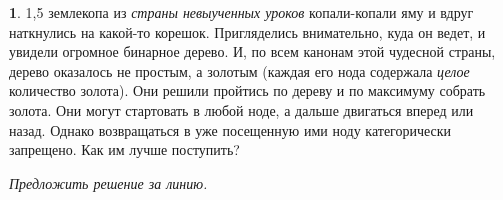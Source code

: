 \documentclass[14pt, a4paper]{extarticle}
\theoremstyle{definition}
\newtheorem{problem}{}
\theoremstyle{definition}
\theoremstyle{remark}
\numberwithin{equation}{section}
\begin{document}
\begin{problem}
    1,5 землекопа из \textit{страны невыученных уроков} копали-копали яму
    и вдруг наткнулись на какой-то корешок. Пригляделись внимательно,
    куда он ведет, и увидели огромное бинарное дерево. И, по всем канонам
    этой чудесной страны, дерево оказалось не простым, а золотым 
    (каждая его нода
    содержала \textit{целое} количество золота). Они решили пройтись 
    по дереву и по максимуму собрать золота. Они могут
    стартовать в любой ноде, а дальше двигаться вперед или назад. 
    Однако возвращаться в уже посещенную ими ноду категорически 
    запрещено. Как им лучше поступить?

    \begin{figure}[H]
        \centering

    \end{figure}

    \textit{Предложить решение за линию.}

\end{problem}
\end{document}

